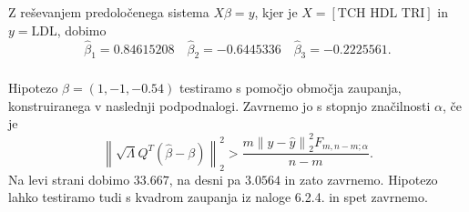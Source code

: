 \documentclass[ letterpaper, titlepage, fleqn]{article}
\newcommand{\norm}[1]{\left\lVert#1\right\rVert}
\begin{document}
\subsubsection{}
Z reševanjem predoločenega sistema $X\hat{\beta} = y$, kjer je $X = [\text{TCH HDL TRI}]$ in $y = \text{LDL}$,  dobimo
$$\hat{\beta}_1 = 0.84615208 \quad \hat{\beta}_2 = -0.6445336 \quad \hat{\beta}_3 =-0.2225561.$$

\subsubsection{}
Hipotezo  $\beta = (1,-1,-0.54)$  testiramo s pomočjo območja zaupanja, konstruiranega v naslednji podpodnalogi. Zavrnemo jo s stopnjo značilnosti $\alpha$, če je
$$\norm{\sqrt{\Lambda} Q^T (\hat{\beta} - \beta)}_2^2 > \frac{m \norm{y - \hat{y}}_2^2 F_{m, n-m; \alpha}}{n-m}.$$
Na levi strani dobimo $33.667$, na desni pa $3.0564$ in zato zavrnemo. Hipotezo lahko testiramo tudi s kvadrom zaupanja iz naloge 6.2.4. in spet zavrnemo.
\end{document}

